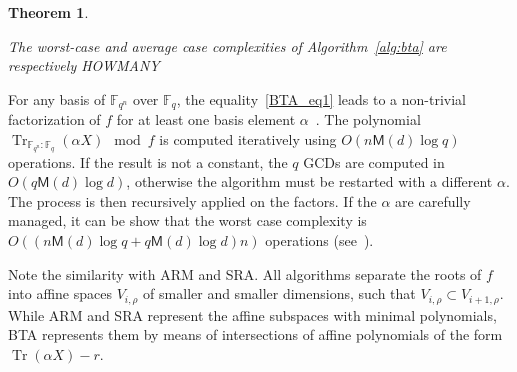 \documentclass{article}
\newcommand{\ff}[1]{\mathbb{F}_{#1}}
\newcommand{\dd}{d}
\newcommand{\qq}{q}
\newcommand{\nn}{n}
\newcommand{\qn}{{\qq^\nn}}
\newcommand{\basef}{\ff{\qq}}
\newcommand{\extf}{\ff{\qn}}
\DeclareMathOperator{\Tr}{Tr}
\newcommand{\trabs}[2]{\Tr_{#1:#2}}
\newcommand{\trextbase}{\trabs{\extf}{\basef}}
\newcommand{\bigO}{O}
\newcommand{\Mul}{\mathsf{M}}
\newcounter{algo}
\newtheorem{Theo}{Theorem}
\newtheorem{Lem}{Lemma}
\begin{document}
\begin{Theo}~\cite{Menvanovans92}

The worst-case and average case complexities of Algorithm~\ref{alg:bta} are respectively  HOWMANY


\end{Theo}







%
For any basis of $\extf$ over $\basef$, the equality~\eqref{BTA_eq1} leads to a non-trivial factorization of $f$ for at least one basis element $\alpha$~\cite{berl70}.
The polynomial $\trextbase(\alpha X) \mod f$ is computed iteratively using
$O(\nn\Mul(d)\log\qq)$ operations. If the result is not a constant,
the $\qq$ GCDs are computed in $O(\qq\Mul(d)\log\dd)$, otherwise the
algorithm must be restarted with a different $\alpha$. 
The process is then recursively applied on the factors. 
 If the $\alpha$ are carefully managed, it can be show that the worst case complexity is 
$\bigO((\nn\Mul(d)\log\qq+\qq\Mul(d)\log\dd) \nn)$ 
operations (see~\cite{Menvanovans92}).








Note the similarity with ARM and SRA. All algorithms separate the roots of $f$ into affine spaces $V_{i,\rho}$ of smaller and smaller dimensions, such that $V_{i,\rho}\subset V_{i+1,\rho}$. While ARM and SRA represent the affine subspaces with minimal polynomials, BTA represents them by means of intersections of affine polynomials of the form $\Tr(\alpha X)-r$.
\end{document}
